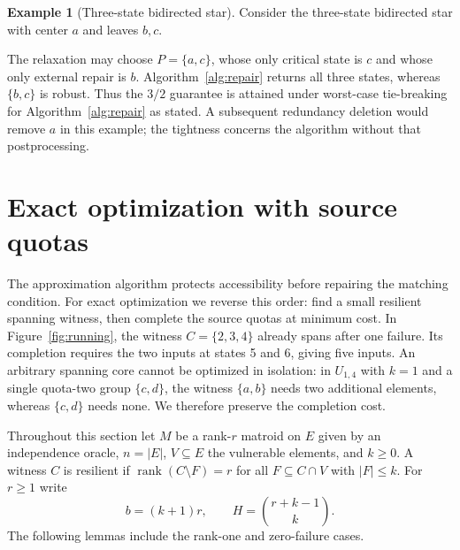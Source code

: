 \documentclass[11pt]{article}
\theoremstyle{definition}
\newtheorem{example}[theorem]{Example}
\theoremstyle{remark}\newtheorem{remark}[theorem]{Remark}
\DeclareMathOperator{\rk}{rank}
\begin{document}
\begin{example}[Three-state bidirected star]\label{ex:star}
Consider the three-state bidirected star with center $a$
and leaves $b,c$.
\begin{center}
\end{center}
The relaxation may choose $P=\{a,c\}$, whose only critical state is
$c$ and whose only external repair is $b$. Algorithm~\ref{alg:repair}
returns all three states, whereas $\{b,c\}$ is robust.
Thus the $3/2$ guarantee is attained under worst-case tie-breaking
for Algorithm~\ref{alg:repair} as stated. A subsequent redundancy
deletion would remove $a$ in this example; the tightness concerns
the algorithm without that postprocessing.
\end{example}

\section{Exact optimization with source quotas}\label{sec:quota-fpt}
The approximation algorithm protects accessibility before repairing
the matching condition. For exact optimization we reverse this
order: find a small resilient spanning witness, then complete the
source quotas at minimum cost. In Figure~\ref{fig:running}, the
witness $C=\{2,3,4\}$ already spans after one failure. Its completion
requires the two inputs at states 5 and 6, giving five inputs.
An arbitrary spanning core cannot be optimized in isolation:
in $U_{1,4}$ with $k=1$ and a single quota-two group $\{c,d\}$,
the witness $\{a,b\}$ needs two additional elements, whereas
$\{c,d\}$ needs none. We therefore preserve the completion cost.

Throughout this section let $M$ be a rank-$r$ matroid on $E$ given
by an independence oracle, $n=|E|$, $V\subseteq E$ the vulnerable
elements, and $k\ge0$. A witness $C$ is resilient if
$\rk(C\setminus F)=r$ for all $F\subseteq C\cap V$ with $|F|\le k$.
For $r\ge1$ write
\[
 b=(k+1)r,\qquad H=\binom{r+k-1}{k}.
\]
The following lemmas include the rank-one and zero-failure cases.
\end{document}
